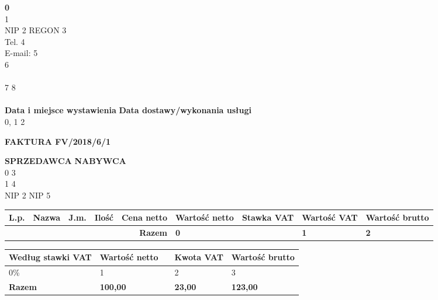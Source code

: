 \documentclass[a4paper,10pt]{article}
\date{}
\begin{document}
    \noindent
    \textbf{{0}}\\
    {1}\\
    NIP {2} REGON {3}\\
    Tel. {4}\\
    E-mail: {5}\\
    {6}\\
    \\
    {7}
    {8}\\
    \\
  
\noindent
    \textbf{Data i miejsce wystawienia}		\hfill \textbf{Data dostawy/wykonania usługi}\\
    {0}, {1}							        \hfill	{2}\\
  
    \begin{center}
    \textbf{\huge{FAKTURA FV/2018/6/1}}
    \end{center}
    \vspace{2cm}
  
    \noindent
    \textbf{SPRZEDAWCA}						\hfill \textbf{NABYWCA}\\
    {0}					                        \hfill {3}\\
    {1}								            \hfill {4}\\
    NIP {2}								        \hfill NIP {5}\\
  
    \begin{table}[H]
    \raggedleft
    \begin{tabular}{| p{} | p{}  | p{} | p{}| p{} | p{} | p{} | p{} | p{} |}
    \hline
    \textbf{L.p.} & \textbf{Nazwa} & \textbf{J.m.} & \textbf{Ilość} & \textbf{Cena netto} & \textbf{Wartość netto} & \textbf{Stawka VAT} & \textbf{Wartość VAT} & \textbf{Wartość brutto} \\ \hline
  
    \hline
    \multicolumn{5}{|r|}{\textbf{Razem}} & \textbf{{0}} & \cellcolor[gray]{0.9} & \textbf{{1}} & \textbf{{2}} \\ \hline
    \end{tabular}
    \end{table}
  
    \begin{table}[H]
    \raggedleft
    \begin{tabular}{| p{} | p{} | p{} | p{} | p{} |}
    \hline
    \textbf{Według stawki VAT} & \textbf{Wartość netto} & \cellcolor[gray]{0.9} & \textbf{Kwota VAT} & \textbf{Wartość brutto} \\ \hline
  
    {0}\% & {1} & \cellcolor[gray]{0.9} & {2} & {3} \\ \hline
  
  \hline
  {\textbf{Razem}}  & \textbf{100,00} & \cellcolor[gray]{0.9} & \textbf{23,00} & \textbf{123,00} \\ \hline
  \end{tabular}
  \end{table}
\end{document}
